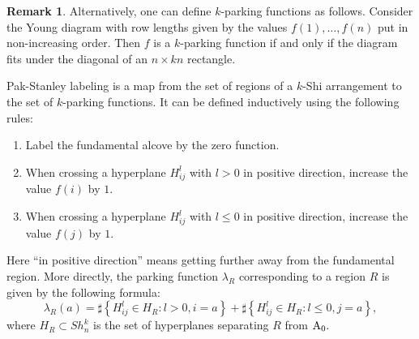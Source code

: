 \documentclass[12pt]{amsart}
\newcommand{\Afund}{{\rm A}_0}  %
\newcommand{\Shikn}{Sh_n^k} %
\theoremstyle{definition}
\newtheorem{remark}{Remark}
\begin{document}
\begin{remark}
Alternatively, one can define $k$-parking functions as follows. Consider the Young diagram with row lengths given by the values $f(1),\ldots,f(n)$ put in non-increasing order. Then $f$ is a $k$-parking function if and only if the diagram fits under the diagonal of an $n\times kn$ rectangle. 
\end{remark}

Pak-Stanley labeling is a map from the set of regions of a $k$-Shi arrangement to the set of $k$-parking functions. It can be defined inductively using the following rules:
\begin{enumerate}
\item Label the fundamental alcove by the zero function.
\item When crossing a hyperplane $H_{ij}^l$ with $l>0$ in positive direction, increase the value $f(i)$ by $1.$
\item When crossing a hyperplane $H_{ij}^l$ with $l\le 0$ in positive direction, increase the value $f(j)$ by $1.$
\end{enumerate}

Here ``in positive direction'' means getting further away from the fundamental region. More directly, the parking function $\lambda_R$ corresponding to a region $R$ is given by the following formula:
$$
\lambda_R(a)=\sharp\left\{H_{ij}^l\in H_R:l>0, i=a\right\}+\sharp\left\{H_{ij}^l\in H_R:l\le 0, j=a\right\},
$$
where $H_R\subset\Shikn$ is the set of hyperplanes separating $R$ from $\Afund.$
\end{document}
